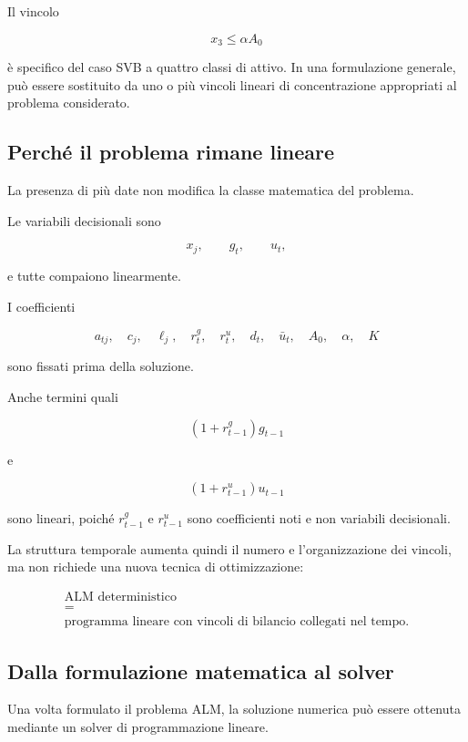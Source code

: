 Il vincolo

\[
x_3\leq\alpha A_0
\]

\noindent \`e specifico del caso SVB a quattro classi di attivo. In una formulazione
generale, pu\`o essere sostituito da uno o pi\`u vincoli lineari di
concentrazione appropriati al problema considerato.

\subsection{Perch\'e il problema rimane lineare}

La presenza di pi\`u date non modifica la classe matematica del problema.

Le variabili decisionali sono

\[
x_j,\qquad g_t,\qquad u_t,
\]

\noindent e tutte compaiono linearmente.

I coefficienti

\[
a_{tj},
\quad
c_j,
\quad
\ell_j,
\quad
r^g_t,
\quad
r^u_t,
\quad
d_t,
\quad
\bar u_t,
\quad
A_0,
\quad
\alpha,
\quad
K
\]

\noindent sono fissati prima della soluzione.

Anche termini quali

\[
(1+r^g_{t-1})g_{t-1}
\]

\noindent e

\[
(1+r^u_{t-1})u_{t-1}
\]

\noindent sono lineari, poich\'e $r^g_{t-1}$ e $r^u_{t-1}$ sono coefficienti noti e non
variabili decisionali.

La struttura temporale aumenta quindi il numero e l'organizzazione dei
vincoli, ma non richiede una nuova tecnica di ottimizzazione:

\[
\boxed{
\begin{array}{c}
\text{ALM deterministico}\\[3pt]
=\\[3pt]
\text{programma lineare con vincoli di bilancio collegati nel tempo}.
\end{array}
}
\]

\subsection{Dalla formulazione matematica al solver}

Una volta formulato il problema ALM, la soluzione numerica pu\`o essere
ottenuta mediante un solver di programmazione lineare.

